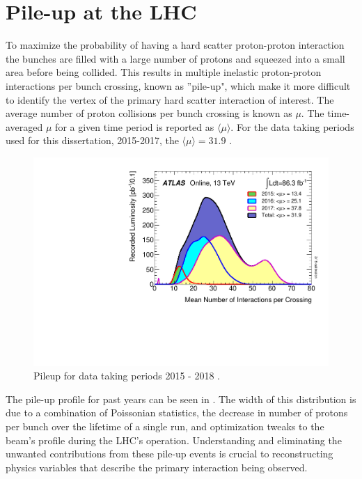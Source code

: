 \section{Pile-up at the LHC} \label{sec:lhc:pileup}

To maximize the probability of having a hard scatter proton-proton interaction
the bunches are filled with a large number of protons and squeezed into a small
area before being collided.  This results in multiple inelastic proton-proton
interactions per bunch crossing, known as ''pile-up", which make it more
difficult to identify the vertex of the primary hard scatter interaction of
interest.  The average number of proton collisions per bunch crossing is known
as $\mu$.  The time-averaged $\mu$ for a given time period is reported as
$\langle \mu \rangle$.  For the data taking periods used for this dissertation,
2015-2017, the $\langle \mu \rangle = 31.9$ \cite{LuminosityPublicResultsRun2}.

\begin{figure}[!htbp] 
  \begin{center}
    \includegraphics[width=0.9\linewidth]{figures/lhc/pileup.pdf}
    \caption{ Pileup for data taking periods 2015 - 2018 \cite{LuminosityPublicResultsRun2}.} 
    \label{fig:pileup} 
  \end{center} 
\end{figure}

The pile-up profile for past years can be seen in .  The width
of this distribution is due to a combination of Poissonian statistics, the
decrease in number of protons per bunch over the lifetime of a single run, and
optimization tweaks to the beam's profile during the LHC's operation.
Understanding and eliminating the unwanted contributions from these pile-up
events is crucial to reconstructing physics variables that describe the primary
interaction being observed.
